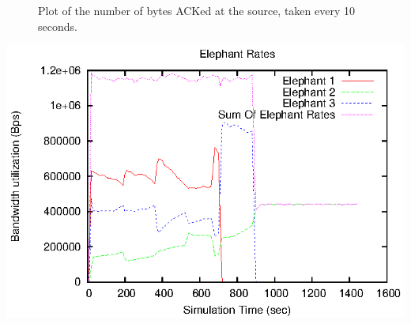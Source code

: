 \documentclass{article}
\begin{document}
\begin{figure}[h]
  \begin{centering}
    
    \caption{Plot of the number of bytes ACKed at the source, taken every 10 seconds.}
    \label{fig:ack_plot}
  \end{centering}
\end{figure}

\begin{center}
  \includegraphics{elephant_bw.eps}
  \caption{Plot of the bandwidth utilization of each elephant, as well as the total bandwidth utilization of all elephants.}
  \label{fig:elephant_bw.eps}
\end{center}
\end{document}
